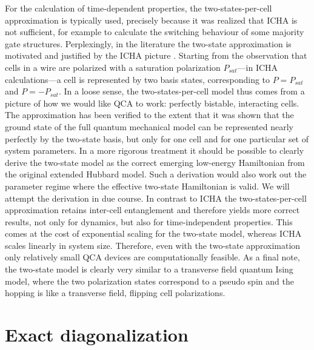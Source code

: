 For the calculation of time-dependent properties, the two-states-per-cell
approximation is typically used, precisely because it was realized that ICHA is
not sufficient, for example to calculate the switching behaviour of some
majority gate structures. Perplexingly, in the literature the two-state
approximation is motivated and justified by the ICHA picture
\cite{tougaw1996dynamic}. Starting from the observation that cells in a wire are
polarized with a saturation polarization $P_{sat}$---in ICHA calculations---a
cell is represented by two basis states, corresponding to $P = P_{sat}$ and $P =
- P_{sat}$. In a loose sense, the two-states-per-cell model thus comes from a
picture of how we would like QCA to work: perfectly bistable, interacting cells.
The approximation has been verified to the extent that it was shown that the
ground state of the full quantum mechanical model can be represented nearly
perfectly by the two-state basis, but only for one cell and for one particular
set of system parameters. In a more rigorous treatment it should be possible to
clearly derive the two-state model as the correct emerging low-energy
Hamiltonian from the original extended Hubbard model. Such a derivation would
also work out the parameter regime where the effective two-state Hamiltonian is
valid. We will attempt the derivation in due course. In contrast to ICHA the
two-states-per-cell approximation retains inter-cell entanglement and therefore
yields more correct results, not only for dynamics, but also for
time-independent properties. This comes at the cost of exponential scaling for
the two-state model, whereas ICHA scales linearly in system size. Therefore,
even with the two-state approximation only relatively small QCA devices are
computationally feasible. As a final note, the two-state model is clearly very
similar to a transverse field quantum Ising model, where the two polarization
states correspond to a pseudo spin and the hopping is like a transverse field,
flipping cell polarizations.


\section{Exact diagonalization}

